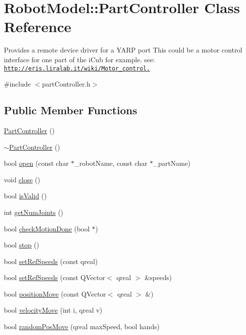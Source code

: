 \hypertarget{class_robot_model_1_1_part_controller}{
\section{RobotModel::PartController Class Reference}
\label{class_robot_model_1_1_part_controller}
}


Provides a remote device driver for a YARP port This could be a motor control interface for one part of the iCub for example. see: \href{http://eris.liralab.it/wiki/Motor_control.}{\tt http://eris.liralab.it/wiki/Motor\_\-control.}  


{\ttfamily \#include $<$partController.h$>$}\subsection*{Public Member Functions}
\begin{DoxyCompactItemize}
\item 
\hyperlink{class_robot_model_1_1_part_controller_a9e5274fba78804eb936fc84048f21e73}{PartController} ()
\item 
\hyperlink{class_robot_model_1_1_part_controller_aee568c7268577894104e0739a99c33f5}{$\sim$PartController} ()
\item 
bool \hyperlink{class_robot_model_1_1_part_controller_a20331379a94c33ef330792e6b9e8b94f}{open} (const char $\ast$\_\-robotName, const char $\ast$\_\-partName)
\item 
void \hyperlink{class_robot_model_1_1_part_controller_a7e0fbd5bd25cebb78cd1b095c2055dac}{close} ()
\item 
bool \hyperlink{class_robot_model_1_1_part_controller_a02d325bdc7bd18023e47f97894a2de49}{isValid} ()
\item 
int \hyperlink{class_robot_model_1_1_part_controller_a2fb04bfb6b1da63201fdaf3dac6591dc}{getNumJoints} ()
\item 
bool \hyperlink{class_robot_model_1_1_part_controller_a4052252cc91ea1387d5a33c968e9a84a}{checkMotionDone} (bool $\ast$)
\item 
bool \hyperlink{class_robot_model_1_1_part_controller_aeb479f7ffd70c0cf80beabf38b1073f7}{stop} ()
\item 
bool \hyperlink{class_robot_model_1_1_part_controller_a3082aaf9c98045fb3309dcaef6416fbe}{setRefSpeeds} (const qreal)
\item 
bool \hyperlink{class_robot_model_1_1_part_controller_a5481c9f2cbbd8370fd2e5b62c38c7d2f}{setRefSpeeds} (const QVector$<$ qreal $>$ \&speeds)
\item 
bool \hyperlink{class_robot_model_1_1_part_controller_aeb2bca8add9b083ebd19d0d2d07fdfd4}{positionMove} (const QVector$<$ qreal $>$ \&)
\item 
bool \hyperlink{class_robot_model_1_1_part_controller_ac5476493b51412c7b6008cf58111543b}{velocityMove} (int i, qreal v)
\item 
bool \hyperlink{class_robot_model_1_1_part_controller_af513e2aa6934bcfeef7d2bf73e9b3cc3}{randomPosMove} (qreal maxSpeed, bool hands)
\end{DoxyCompactItemize}


